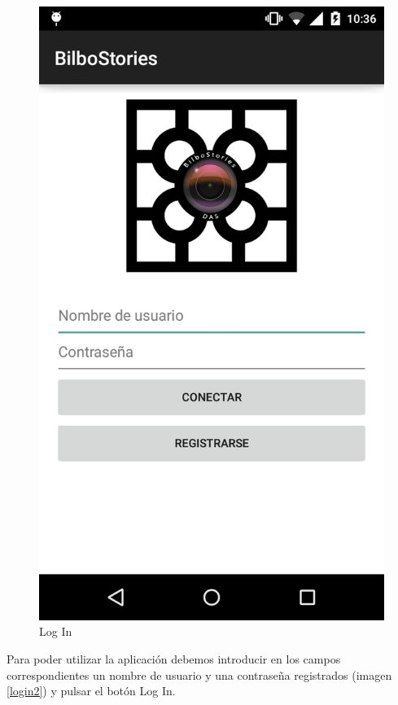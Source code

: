 \documentclass[11pt,a4paper, titlepage]{article}
\begin{document}
	\begin{figure}[hbtp]
		\centering
		\includegraphics[scale = 0.25 ]{img/0}
		\caption{Log In}
		\label{login1}
	\end{figure}
	
Para poder utilizar la aplicación debemos introducir en los campos correspondientes un nombre de usuario y una contraseña registrados (imagen \ref{login2}) y pulsar el botón Log In.
	
\end{document}
